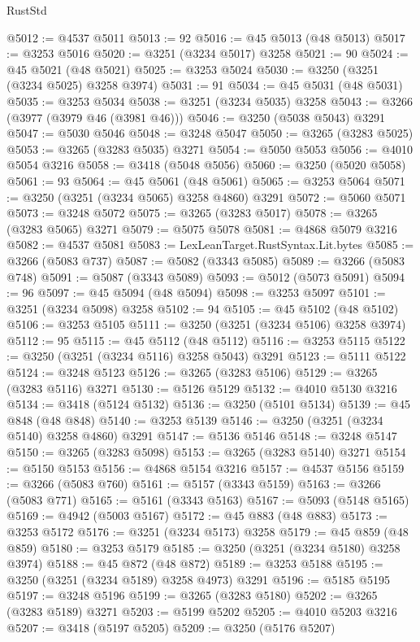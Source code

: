 \begin{lexlean}{RustStd}
\begin{coremodule}
@5012 := @4537 @5011
@5013 := 92
@5016 := @45 @5013 (@48 @5013)
@5017 := @3253 @5016
@5020 := @3251 (@3234 @5017) @3258
@5021 := 90
@5024 := @45 @5021 (@48 @5021)
@5025 := @3253 @5024
@5030 := @3250 (@3251 (@3234 @5025) @3258 @3974)
@5031 := 91
@5034 := @45 @5031 (@48 @5031)
@5035 := @3253 @5034
@5038 := @3251 (@3234 @5035) @3258
@5043 := @3266 (@3977 (@3979 @46 (@3981 @46)))
@5046 := @3250 (@5038 @5043) @3291
@5047 := @5030 @5046
@5048 := @3248 @5047
@5050 := @3265 (@3283 @5025)
@5053 := @3265 (@3283 @5035) @3271
@5054 := @5050 @5053
@5056 := @4010 @5054 @3216
@5058 := @3418 (@5048 @5056)
@5060 := @3250 (@5020 @5058)
@5061 := 93
@5064 := @45 @5061 (@48 @5061)
@5065 := @3253 @5064
@5071 := @3250 (@3251 (@3234 @5065) @3258 @4860) @3291
@5072 := @5060 @5071
@5073 := @3248 @5072
@5075 := @3265 (@3283 @5017)
@5078 := @3265 (@3283 @5065) @3271
@5079 := @5075 @5078
@5081 := @4868 @5079 @3216
@5082 := @4537 @5081
@5083 := LexLeanTarget.RustSyntax.Lit.bytes
@5085 := @3266 (@5083 @737)
@5087 := @5082 (@3343 @5085)
@5089 := @3266 (@5083 @748)
@5091 := @5087 (@3343 @5089)
@5093 := @5012 (@5073 @5091)
@5094 := 96
@5097 := @45 @5094 (@48 @5094)
@5098 := @3253 @5097
@5101 := @3251 (@3234 @5098) @3258
@5102 := 94
@5105 := @45 @5102 (@48 @5102)
@5106 := @3253 @5105
@5111 := @3250 (@3251 (@3234 @5106) @3258 @3974)
@5112 := 95
@5115 := @45 @5112 (@48 @5112)
@5116 := @3253 @5115
@5122 := @3250 (@3251 (@3234 @5116) @3258 @5043) @3291
@5123 := @5111 @5122
@5124 := @3248 @5123
@5126 := @3265 (@3283 @5106)
@5129 := @3265 (@3283 @5116) @3271
@5130 := @5126 @5129
@5132 := @4010 @5130 @3216
@5134 := @3418 (@5124 @5132)
@5136 := @3250 (@5101 @5134)
@5139 := @45 @848 (@48 @848)
@5140 := @3253 @5139
@5146 := @3250 (@3251 (@3234 @5140) @3258 @4860) @3291
@5147 := @5136 @5146
@5148 := @3248 @5147
@5150 := @3265 (@3283 @5098)
@5153 := @3265 (@3283 @5140) @3271
@5154 := @5150 @5153
@5156 := @4868 @5154 @3216
@5157 := @4537 @5156
@5159 := @3266 (@5083 @760)
@5161 := @5157 (@3343 @5159)
@5163 := @3266 (@5083 @771)
@5165 := @5161 (@3343 @5163)
@5167 := @5093 (@5148 @5165)
@5169 := @4942 (@5003 @5167)
@5172 := @45 @883 (@48 @883)
@5173 := @3253 @5172
@5176 := @3251 (@3234 @5173) @3258
@5179 := @45 @859 (@48 @859)
@5180 := @3253 @5179
@5185 := @3250 (@3251 (@3234 @5180) @3258 @3974)
@5188 := @45 @872 (@48 @872)
@5189 := @3253 @5188
@5195 := @3250 (@3251 (@3234 @5189) @3258 @4973) @3291
@5196 := @5185 @5195
@5197 := @3248 @5196
@5199 := @3265 (@3283 @5180)
@5202 := @3265 (@3283 @5189) @3271
@5203 := @5199 @5202
@5205 := @4010 @5203 @3216
@5207 := @3418 (@5197 @5205)
@5209 := @3250 (@5176 @5207)

\end{coremodule}
\end{lexlean}

